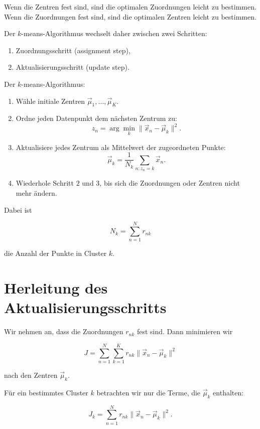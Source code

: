 Wenn die Zentren fest sind, sind die optimalen Zuordnungen leicht zu bestimmen.
Wenn die Zuordnungen fest sind, sind die optimalen Zentren leicht zu bestimmen.

Der \(k\)-means-Algorithmus wechselt daher zwischen zwei Schritten:

\begin{enumerate}
    \item Zuordnungsschritt (assignment step),
    \item Aktualisierungsschritt (update step).
\end{enumerate}

\begin{definitionbox}
Der \(k\)-means-Algorithmus:

\begin{enumerate}
    \item Wähle initiale Zentren \(\vec{\mu}_1,\dots,\vec{\mu}_K\).
    \item Ordne jeden Datenpunkt dem nächsten Zentrum zu:
    \[
        z_n
        =
        \arg\min_k
        \|\vec{x}_n-\vec{\mu}_k\|^2.
    \]
    \item Aktualisiere jedes Zentrum als Mittelwert der zugeordneten Punkte:
    \[
        \vec{\mu}_k
        =
        \frac{1}{N_k}
        \sum_{n:z_n=k}
        \vec{x}_n.
    \]
    \item Wiederhole Schritt \(2\) und \(3\), bis sich die Zuordnungen oder Zentren nicht mehr ändern.
\end{enumerate}
\end{definitionbox}

Dabei ist

\[
    N_k
    =
    \sum_{n=1}^{N}
    r_{nk}
\]

die Anzahl der Punkte in Cluster \(k\).

\section{Herleitung des Aktualisierungsschritts}

Wir nehmen an, dass die Zuordnungen \(r_{nk}\) fest sind.
Dann minimieren wir

\[
    J
    =
    \sum_{n=1}^{N}
    \sum_{k=1}^{K}
    r_{nk}
    \|\vec{x}_n-\vec{\mu}_k\|^2
\]

nach den Zentren \(\vec{\mu}_k\).

Für ein bestimmtes Cluster \(k\) betrachten wir nur die Terme, die \(\vec{\mu}_k\) enthalten:

\[
    J_k
    =
    \sum_{n=1}^{N}
    r_{nk}
    \|\vec{x}_n-\vec{\mu}_k\|^2.
\]

